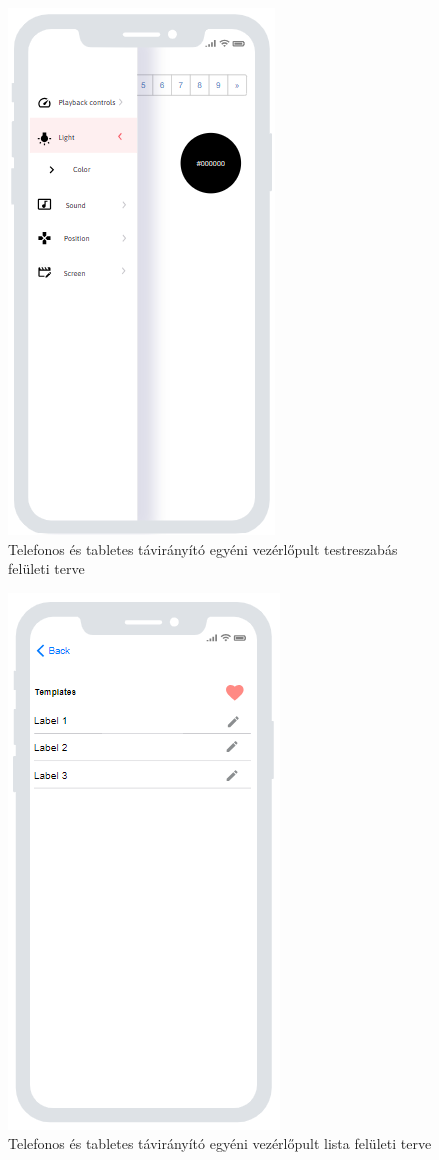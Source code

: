 \documentclass{article}
\begin{document}
\begin{figure}[H]
\centering
\includegraphics[height=1\linewidth]{vezerlopult_testreszabas.png}
\caption{\label{fig:image}Telefonos és tabletes távirányító egyéni vezérlőpult testreszabás felületi terve}
\end{figure}

\begin{figure}[H]
\centering
\includegraphics[height=1\linewidth]{egyeni_vezerlopultok.png}
\caption{\label{fig:image}Telefonos és tabletes távirányító egyéni vezérlőpult lista felületi terve}
\end{figure}
\end{document}
